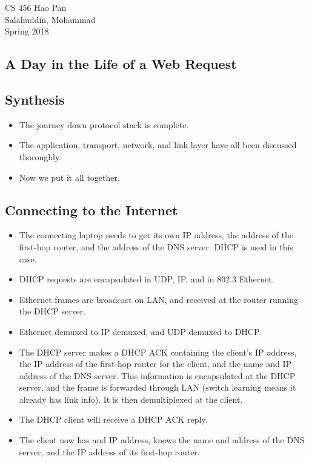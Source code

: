 \documentclass{article}
\begin{document}
\noindent
{CS 456 \hfill Hao Pan}\\
{Salahuddin, Mohammad}\\
{Spring 2018}


\begin{center}
\section{A Day in the Life of a Web Request}
\noindent
\end{center}

\subsection{Synthesis}

\begin{itemize}
\item The journey down protocol stack is complete.
\item The application, transport, network, and link layer have all been discussed thoroughly.
\item Now we put it all together.
\end{itemize}

\subsection{Connecting to the Internet}

\begin{itemize}
\item The connecting laptop needs to get its own IP address, the address of the first-hop router, and the address of the DNS server. DHCP is used in this case.
\item DHCP requests are encapsulated in UDP, IP, and in 802.3 Ethernet.
\item Ethernet frames are broadcast on LAN, and received at the router running the DHCP server.
\item Ethernet demuxed to IP demuxed, and UDP demuxed to DHCP.
\item The DHCP server makes a DHCP ACK containing the client's IP address, the IP address of the first-hop router for the client, and the name and IP address of the DNS server. This information is encapsulated at the DHCP server, and the frame is forwarded through LAN (switch learning means it already has link info). It is then demultiplexed at the client.
\item The DHCP client will receive a DHCP ACK reply.
\item The client now has and IP address, knows the name and address of the DNS server, and the IP address of its first-hop router.
\end{itemize}
\end{document}
